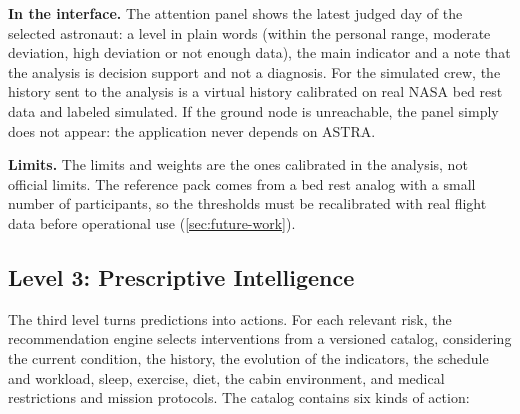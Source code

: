 \medskip\noindent\textbf{In the interface.} The attention panel shows the latest judged day of the selected astronaut: a level in plain words (within the personal range, moderate deviation, high deviation or not enough data), the main indicator and a note that the analysis is decision support and not a diagnosis. For the simulated crew, the history sent to the analysis is a virtual history calibrated on real NASA bed rest data and labeled simulated. If the ground node is unreachable, the panel simply does not appear: the application never depends on ASTRA.

\medskip\noindent\textbf{Limits.} The limits and weights are the ones calibrated in the analysis, not official limits. The reference pack comes from a bed rest analog with a small number of participants, so the thresholds must be recalibrated with real flight data before operational use (\ref{sec:future-work}).

\subsection{Level 3: Prescriptive Intelligence}
\label{subsec:recommendations}

The third level turns predictions into actions. For each relevant risk, the recommendation engine selects interventions from a versioned catalog, considering the current condition, the history, the evolution of the indicators, the schedule and workload, sleep, exercise, diet, the cabin environment, and medical restrictions and mission protocols. The catalog contains six kinds of action:

